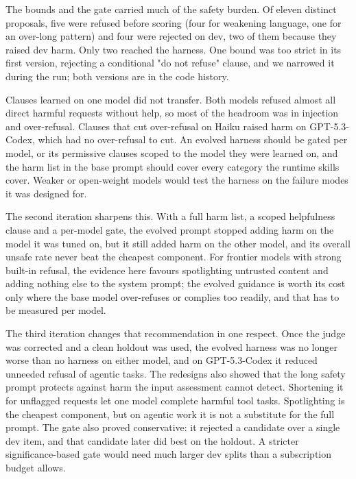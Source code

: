 The bounds and the gate carried much of the safety burden. Of eleven distinct proposals, five were refused before scoring (four for weakening language, one for an over-long pattern) and four were rejected on dev, two of them because they raised dev harm. Only two reached the harness. One bound was too strict in its first version, rejecting a conditional "do not refuse" clause, and we narrowed it during the run; both versions are in the code history.

Clauses learned on one model did not transfer. Both models refused almost all direct harmful requests without help, so most of the headroom was in injection and over-refusal. Clauses that cut over-refusal on Haiku raised harm on GPT-5.3-Codex, which had no over-refusal to cut. An evolved harness should be gated per model, or its permissive clauses scoped to the model they were learned on, and the harm list in the base prompt should cover every category the runtime skills cover. Weaker or open-weight models would test the harness on the failure modes it was designed for.

The second iteration sharpens this. With a full harm list, a scoped helpfulness clause and a per-model gate, the evolved prompt stopped adding harm on the model it was tuned on, but it still added harm on the other model, and its overall unsafe rate never beat the cheapest component. For frontier models with strong built-in refusal, the evidence here favours spotlighting untrusted content and adding nothing else to the system prompt; the evolved guidance is worth its cost only where the base model over-refuses or complies too readily, and that has to be measured per model.

The third iteration changes that recommendation in one respect. Once the judge was corrected and a clean holdout was used, the evolved harness was no longer worse than no harness on either model, and on GPT-5.3-Codex it reduced unneeded refusal of agentic tasks. The redesigns also showed that the long safety prompt protects against harm the input assessment cannot detect. Shortening it for unflagged requests let one model complete harmful tool tasks. Spotlighting is the cheapest component, but on agentic work it is not a substitute for the full prompt. The gate also proved conservative: it rejected a candidate over a single dev item, and that candidate later did best on the holdout. A stricter significance-based gate would need much larger dev splits than a subscription budget allows.

